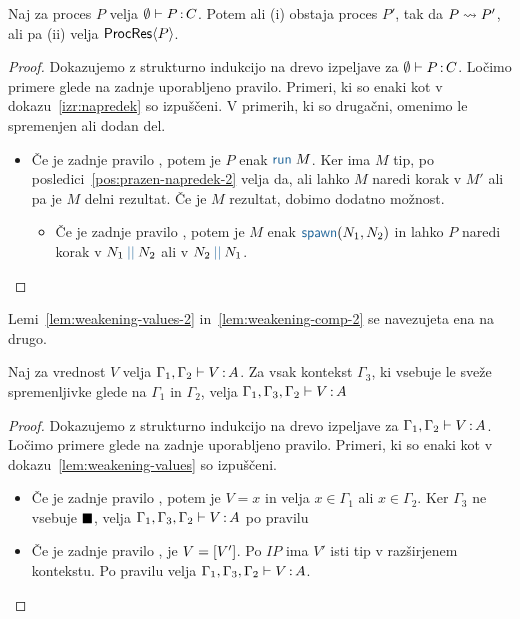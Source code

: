 \begin{izrek}[o napredku]
	Naj za proces $P$ velja $\emptyset \vdash P \mathinner{:} C$. Potem ali (i) obstaja proces $P'$, tak da $P \leadsto P'$, ali pa (ii) velja $\mathsf{ProcRes}\langle P \rangle$.
\end{izrek}

\begin{proof}
	Dokazujemo z strukturno indukcijo na drevo izpeljave za $\emptyset \vdash P \mathinner{:} C$.
	Ločimo primere glede na zadnje uporabljeno pravilo.
	Primeri, ki so enaki kot v dokazu~\ref{izr:napredek} so izpuščeni. V primerih, ki so drugačni, omenimo le spremenjen ali dodan del.
	
	\begin{itemize}
		\item Če je zadnje pravilo , potem je $P$ enak $\tmrun{M}$. Ker ima $M$ tip, po posledici~\ref{pos:prazen-napredek-2} velja da, ali lahko $M$ naredi korak v $M'$ ali pa je $M$ delni rezultat.
		Če je $M$ rezultat, dobimo dodatno možnost.
		\begin{itemize}
			\item Če je zadnje pravilo , potem je $M$ enak $\tmspawn{N_1}{N_2}$ in lahko $P$ naredi korak v $\tmpar{N_1}{N_2}$ ali v $\tmpar{N_2}{N_1}$.
		\end{itemize}		
	\end{itemize}
\end{proof}

Lemi~\ref{lem:weakening-values-2} in~\ref{lem:weakening-comp-2} se navezujeta ena na drugo.

\begin{lema}\label{lem:weakening-values-2}
	Naj za vrednost $V$ velja $\Gamma_1, \Gamma_2 \vdash V \mathinner{:} A$. Za vsak kontekst $\Gamma_3$, ki vsebuje le sveže spremenljivke glede na $\Gamma_1$ in $\Gamma_2$, velja $\Gamma_1, \Gamma_3, \Gamma_2 \vdash V \mathinner{:} A$
\end{lema}

\begin{proof}
	Dokazujemo z strukturno indukcijo na drevo izpeljave za $\Gamma_1, \Gamma_2 \vdash V \mathinner{:} A$.
	Ločimo primere glede na zadnje uporabljeno pravilo.
	Primeri, ki so enaki kot v dokazu~\ref{lem:weakening-values} so izpuščeni.
	
	\begin{itemize}
		\item Če je zadnje pravilo , potem je $V = x$ in velja $x \in \Gamma_1$ ali $x \in \Gamma_2$.
		Ker $\Gamma_3$ ne vsebuje $\blacksquare$, velja $\Gamma_1, \Gamma_3, \Gamma_2 \vdash V \mathinner{:} A$ po pravilu 
		
		\item Če je zadnje pravilo , je $V = [V']$. Po $IP$ ima $V'$ isti tip v razširjenem kontekstu.
		Po pravilu  velja $\Gamma_1, \Gamma_3, \Gamma_2 \vdash V \mathinner{:} A$.
		
	\end{itemize}
\end{proof}

